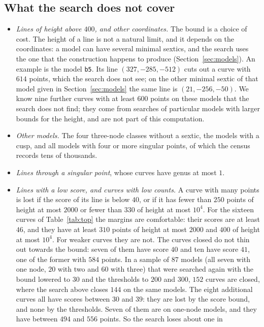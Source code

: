 \documentclass[11pt]{article}
\theoremstyle{remark}
\begin{document}
\subsection*{What the search does not cover}
\begin{itemize}\itemsep 1pt
\item \emph{Lines of height above $400$, and other coordinates.}  The bound is a choice of cost.  The height of a line is not a
natural limit, and it depends on the coordinates: a model can have several minimal sextics, and the search uses the one that the
construction happens to produce (Section~\ref{sec:models}).  An example is the model \texttt{b5}.  Its line $(327,-285,-512)$ cuts
out a curve with $614$ points, which the search does not see; on the other minimal sextic of that model given in
Section~\ref{sec:models} the same line is $(21,-256,-50)$.  We know nine further curves with at least $600$ points on these
models that the search does not find; they come from searches of particular models with larger bounds for the height, and are
not part of this computation.
\item \emph{Other models.}  The four three-node classes without a sextic, the models with a cusp, and all models with four or
more singular points, of which the census records tens of thousands.
\item \emph{Lines through a singular point}, whose curves have genus at most $1$.
\item \emph{Lines with a low score, and curves with low counts.}  A curve with many points is lost if the score of its line is
below $40$, or if it has fewer than $250$ points of height at most $2000$ or fewer than $330$ of height at most $10^4$.  For the
sixteen curves of Table~\ref{tab:top} the margins are comfortable: their scores are at least $46$, and they have at least $310$
points of height at most $2000$ and $400$ of height at most $10^4$.  For weaker curves they are not.  The curves closed do not
thin out towards the bound: seven of them have score $40$ and ten have score $41$, one of the former with $584$ points.
In a sample of $87$ models (all seven with one node, $20$ with two and $60$ with three) that were searched again with the bound
lowered to $30$ and the thresholds to $200$ and $300$, $152$ curves are closed, where the search above closes $144$ on the same
models.  The eight additional curves all have scores between $30$ and $39$: they are lost by the score bound, and none by the
thresholds.  Seven of them are on one-node models, and they have between $494$ and $556$ points.  So the search loses about one in

\end{itemize}
\end{document}
